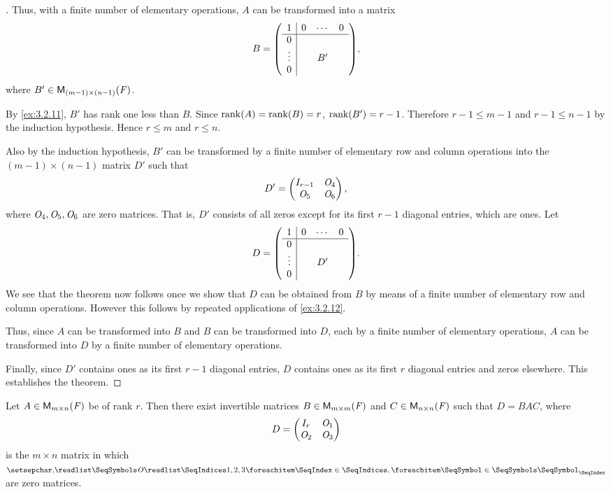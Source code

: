\begin{proof}[]
	Thus, with a finite number of elementary operations, \(A\) can be transformed into a matrix
	\[
		B = \pa{\begin{array}{c|ccc}
				1      & 0 & \cdots & 0 \\
				\hline
				0      &   &        &   \\
				\vdots &   & B'     &   \\
				0      &   &        &
			\end{array}},
	\]
	where \(B' \in \mathsf{M}_{{(m - 1)} \times (n - 1)}({\mathit{F}})\).

	By \cref{ex:3.2.11}, \(B'\) has rank one less than \(B\).
	Since \(\rk{A} = \rk{B} = r\), \(\rk{B'} = r - 1\).
	Therefore \(r - 1 \leq m - 1\) and \(r - 1 \leq n - 1\) by the induction hypothesis.
	Hence \(r \leq m\) and \(r \leq n\).

	Also by the induction hypothesis, \(B'\) can be transformed by a finite number of elementary row and column operations into the \((m-1) \times (n-1)\) matrix \(D'\) such that
	\[
		D' = \begin{pmatrix}
			I_{r - 1} & \mathit{O}_4 \\
			\mathit{O}_5     & \mathit{O}_6
		\end{pmatrix},
	\]
	where \(\mathit{O}_4, \mathit{O}_5, \mathit{O}_6\) are zero matrices.
	That is, \(D'\) consists of all zeros except for its first \(r - 1\) diagonal entries, which are ones.
	Let
	\[
		D = \pa{\begin{array}{c|ccc}
				1      & 0 & \cdots & 0 \\
				\hline
				0      &   &        &   \\
				\vdots &   & D'     &   \\
				0      &   &        &
			\end{array}}.
	\]
	We see that the theorem now follows once we show that \(D\) can be obtained from \(B\) by means of a finite number of elementary row and column operations.
	However this follows by repeated applications of \cref{ex:3.2.12}.

	Thus, since \(A\) can be transformed into \(B\) and \(B\) can be transformed into \(D\), each by a finite number of elementary operations, \(A\) can be transformed into \(D\) by a finite number of elementary operations.

	Finally, since \(D'\) contains ones as its first \(r - 1\) diagonal entries, \(D\) contains ones as its first \(r\) diagonal entries and zeros elsewhere.
	This establishes the theorem.
\end{proof}

\begin{cor}\label{3.2.4}
	Let \(A \in \mathsf{M}_{{m} \times n}({\mathit{F}})\) be of rank \(r\).
	Then there exist invertible matrices \(B \in \mathsf{M}_{{m} \times m}({\mathit{F}})\) and \(C \in \mathsf{M}_{{n} \times n}({\mathit{F}})\) such that \(D = BAC\), where
	\[
		D = \begin{pmatrix}
			I_r   & \mathit{O}_1 \\
			\mathit{O}_2 & \mathit{O}_3
		\end{pmatrix}
	\]
	is the \(m \times n\) matrix in which \(\seq{\zm}{1,2,3}\) are zero matrices.
\end{cor}

